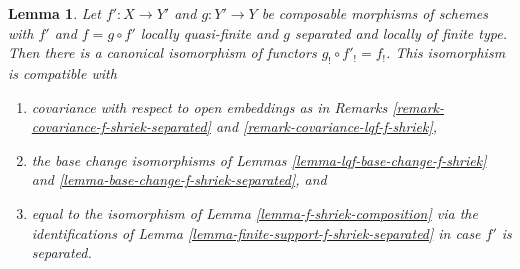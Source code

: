 \documentclass{stacks-project}
\theoremstyle{plain}
\newtheorem{lemma}[subsection]{Lemma}
\theoremstyle{definition}
\theoremstyle{remark}
\numberwithin{equation}{subsection}
\begin{document}
\begin{lemma}
\label{lemma-lqf-separated-shriek-composition}
Let $f' : X \to Y'$ and $g : Y' \to Y$ be composable morphisms of schemes
with $f'$ and $f = g \circ f'$ locally quasi-finite and $g$ separated and
locally of finite type. Then there is a canonical isomorphism of functors
$g_! \circ f'_! = f_!$. This isomorphism is compatible with
\begin{enumerate}
\item[(a)] covariance with respect to open embeddings as in
Remarks \ref{remark-covariance-f-shriek-separated} and
\ref{remark-covariance-lqf-f-shriek},
\item[(b)] the base change isomorphisms of
Lemmas \ref{lemma-lqf-base-change-f-shriek}
and \ref{lemma-base-change-f-shriek-separated}, and
\item[(c)] equal to the isomorphism of Lemma \ref{lemma-f-shriek-composition}
via the identifications of Lemma \ref{lemma-finite-support-f-shriek-separated}
in case $f'$ is separated.
\end{enumerate}
\end{lemma}
\end{document}
